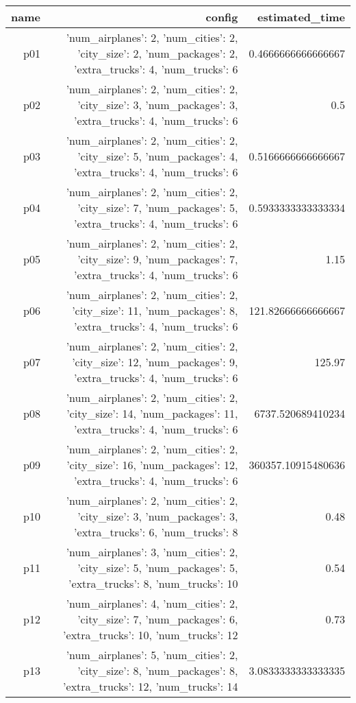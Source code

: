\documentclass{article}
\begin{document}
                            \begin{center}
                            \scriptsize
                            \begin{tabular}{r|r|r}
                            name & config & estimated\_time\\\midrule
                              p01&{'num\_airplanes': 2, 'num\_cities': 2, 'city\_size': 2, 'num\_packages': 2, 'extra\_trucks': 4, 'num\_trucks': 6}&0.4666666666666667\\
  p02&{'num\_airplanes': 2, 'num\_cities': 2, 'city\_size': 3, 'num\_packages': 3, 'extra\_trucks': 4, 'num\_trucks': 6}&0.5\\
  p03&{'num\_airplanes': 2, 'num\_cities': 2, 'city\_size': 5, 'num\_packages': 4, 'extra\_trucks': 4, 'num\_trucks': 6}&0.5166666666666667\\
  p04&{'num\_airplanes': 2, 'num\_cities': 2, 'city\_size': 7, 'num\_packages': 5, 'extra\_trucks': 4, 'num\_trucks': 6}&0.5933333333333334\\
  p05&{'num\_airplanes': 2, 'num\_cities': 2, 'city\_size': 9, 'num\_packages': 7, 'extra\_trucks': 4, 'num\_trucks': 6}&1.15\\
  p06&{'num\_airplanes': 2, 'num\_cities': 2, 'city\_size': 11, 'num\_packages': 8, 'extra\_trucks': 4, 'num\_trucks': 6}&121.82666666666667\\
  p07&{'num\_airplanes': 2, 'num\_cities': 2, 'city\_size': 12, 'num\_packages': 9, 'extra\_trucks': 4, 'num\_trucks': 6}&125.97\\
  p08&{'num\_airplanes': 2, 'num\_cities': 2, 'city\_size': 14, 'num\_packages': 11, 'extra\_trucks': 4, 'num\_trucks': 6}&6737.520689410234\\
  p09&{'num\_airplanes': 2, 'num\_cities': 2, 'city\_size': 16, 'num\_packages': 12, 'extra\_trucks': 4, 'num\_trucks': 6}&360357.10915480636\\
  p10&{'num\_airplanes': 2, 'num\_cities': 2, 'city\_size': 3, 'num\_packages': 3, 'extra\_trucks': 6, 'num\_trucks': 8}&0.48\\
  p11&{'num\_airplanes': 3, 'num\_cities': 2, 'city\_size': 5, 'num\_packages': 5, 'extra\_trucks': 8, 'num\_trucks': 10}&0.54\\
  p12&{'num\_airplanes': 4, 'num\_cities': 2, 'city\_size': 7, 'num\_packages': 6, 'extra\_trucks': 10, 'num\_trucks': 12}&0.73\\
  p13&{'num\_airplanes': 5, 'num\_cities': 2, 'city\_size': 8, 'num\_packages': 8, 'extra\_trucks': 12, 'num\_trucks': 14}&3.0833333333333335\\

\end{tabular}
\end{center}
\end{document}
